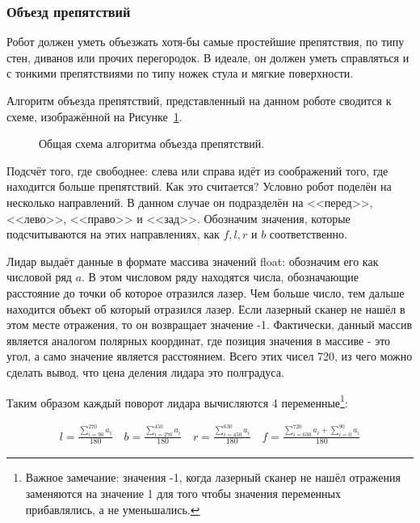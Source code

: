 \subsubsection{Объезд препятствий}

Робот должен уметь объезжать хотя-бы самые простейшие препятствия, по типу стен, диванов или прочих перегородок. В идеале, он должен уметь справляться и с тонкими препятствиями по типу ножек стула и мягкие поверхности.

Алгоритм объезда препятствий, представленный на данном роботе сводится к схеме, изображённой на Рисунке~\ref{fig:algorithm-obstacle}.

\begin{figure}[ht]
  \caption{Общая схема алгоритма объезда препятствий.}\label{fig:algorithm-obstacle}
\end{figure}

Подсчёт того, где свободнее: слева или справа идёт из соображений того, где находится больше препятствий. Как это считается? Условно робот поделён на несколько направлений. В данном случае он подразделён на <<перед>>, <<лево>>, <<право>> и <<зад>>. Обозначим значения, которые подсчитываются на этих направлениях, как $f, l, r$ и $b$ соответственно. 

Лидар выдаёт данные в формате массива значений float: обозначим его как числовой ряд $a$. В этом числовом ряду находятся числа, обозначающие расстояние до точки об которое отразился лазер. Чем больше число, тем дальше находится объект об который отразился лазер. Если лазерный сканер не нашёл в этом месте отражения, то он возвращает значение -1. Фактически, данный массив является аналогом полярных координат, где позиция значения в массиве - это угол, а само значение является расстоянием. Всего этих чисел 720, из чего можно сделать вывод, что цена деления лидара это полградуса. 

Таким образом каждый поворот лидара вычисляются 4 переменные\footnote{Важное замечание: значения -1, когда лазерный сканер не нашёл отражения заменяются на значение 1 для того чтобы значения переменных прибавлялись, а не уменьшались.}:

\[
\begin{array}{c}
l = \frac{\displaystyle\sum_{i=90}^{270} a_i}{180} \quad
b = \frac{\displaystyle\sum_{i=270}^{450} a_i}{180}\quad
r = \frac{\displaystyle\sum_{i=450}^{630} a_i}{180} \quad
f = \frac{\displaystyle\sum_{i=630}^{720} a_i + \sum_{i=0}^{90} a_i}{180}
\end{array}
\]


